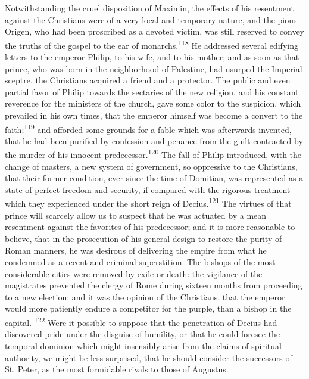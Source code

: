 
Notwithstanding the cruel disposition of Maximin, the effects of
his resentment against the Christians were of a very local and
temporary nature, and the pious Origen, who had been proscribed
as a devoted victim, was still reserved to convey the truths of
the gospel to the ear of monarchs.\textsuperscript{118} He addressed several
edifying letters to the emperor Philip, to his wife, and to his
mother; and as soon as that prince, who was born in the
neighborhood of Palestine, had usurped the Imperial sceptre, the
Christians acquired a friend and a protector. The public and even
partial favor of Philip towards the sectaries of the new
religion, and his constant reverence for the ministers of the
church, gave some color to the suspicion, which prevailed in his
own times, that the emperor himself was become a convert to the
faith;\textsuperscript{119} and afforded some grounds for a fable which was
afterwards invented, that he had been purified by confession and
penance from the guilt contracted by the murder of his innocent
predecessor.\textsuperscript{120} The fall of Philip introduced, with the change
of masters, a new system of government, so oppressive to the
Christians, that their former condition, ever since the time of
Domitian, was represented as a state of perfect freedom and
security, if compared with the rigorous treatment which they
experienced under the short reign of Decius.\textsuperscript{121} The virtues of
that prince will scarcely allow us to suspect that he was
actuated by a mean resentment against the favorites of his
predecessor; and it is more reasonable to believe, that in the
prosecution of his general design to restore the purity of Roman
manners, he was desirous of delivering the empire from what he
condemned as a recent and criminal superstition. The bishops of
the most considerable cities were removed by exile or death: the
vigilance of the magistrates prevented the clergy of Rome during
sixteen months from proceeding to a new election; and it was the
opinion of the Christians, that the emperor would more patiently
endure a competitor for the purple, than a bishop in the capital. \textsuperscript{122}
Were it possible to suppose that the penetration of Decius
had discovered pride under the disguise of humility, or that he
could foresee the temporal dominion which might insensibly arise
from the claims of spiritual authority, we might be less
surprised, that he should consider the successors of St. Peter,
as the most formidable rivals to those of Augustus.

